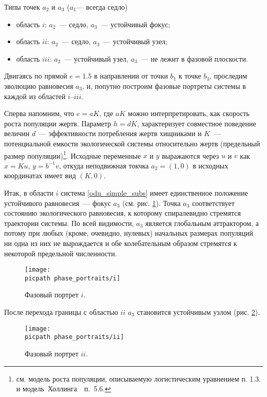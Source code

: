 \documentclass[oneside,final,12pt]{article}
\newcommand*\picsize{0.5\textwidth}
\newcommand*\picpath{pictures/}
\theoremstyle{plain}
\theoremstyle{remark}
\theoremstyle{definition}
\theoremstyle{plain}
\begin{document}
		Типы точек \(a_2\) и \(a_3\) (\(a_1\)--- всегда седло) 
		\begin{itemize}
			\item[] область \(i\): \(a_2\)~--- седло, \(a_3\)~--- устойчивый фокус;
			\item[] область \(ii\): \(a_2\)~--- седло, \(a_3\)~--- устойчивый узел;
			\item[] область \(iii\): \(a_2\)~--- устойчивый узел, \(a_3\)~--- не лежит в фазовой плоскости.
		\end{itemize}

		Двигаясь по прямой \(e = 1.5\) в направлении от точки \(b_1\) к точке \(b_3\), проследим эволюцию равновесия \(a_3\), и, попутно построим фазовые портреты системы в каждой из областей \(i\)--\(iii\).

		\bigskip
		Сперва напомним, что \(e = aK\), где \(aK\) можно интерпретировать, как скорость роста популяции жертв. Параметр \(h = dK\), характеризует совместное поведение величин \(d\)~--- эффективности потребления жертв хищниками и \(K\)~--- потенциальной емкости экологической системы относительно жертв (предельный размер популяции)\footnote{см. модель роста популяции, описываемую логистическим уравнением \cite{DSMB} п. 1.3. и \mbox{модель Холлинга \cite{DSMB} п. 5.6.}}. Исходные переменные \(x\) и \(y\) выражаются через \(u\) и \(v\) как \(x = Ku\), \(y = b^{-1}v\), откуда неподвижная токчка \(a_2 = (1,0)\) в исходных координатах имеет вид \((K,0)\).
		
		\bigskip
		Итак, в области \(i\) система \eqref{odu_simple_subs} имеет единственное положение устойчивого равновесия~--- фокус \(a_3\) (см. рис. \ref{phase_portrait_i}). Точка \(a_3\) соответствует состоянию экологического равновесия, к которому спиралевидно стремятся траектории системы. По всей видимости, \(a_3\) является глобальным аттрактором, а потому при любых (кроме, очевидно, нулевых) начальных размерах популяций ни одна из них не вырождается и обе колебательным образом стремятся к некоторой предельной численности.

		\begin{figure}[!h]
			\centering
			\texttt{[image: \\picpath phase\_portraits/i]}
			\caption{Фазовый портрет \(i\).} \label{phase_portrait_i}
		\end{figure}

		После перехода границы с областью \(ii\) \(a_3\) становится устойчивым узлом (рис. \ref{phase_portrait_ii}).

		\begin{figure}[!h]
			\centering
			\texttt{[image: \\picpath phase\_portraits/ii]}
			\caption{Фазовый портрет \(ii\).} \label{phase_portrait_ii}
		\end{figure}
\end{document}
